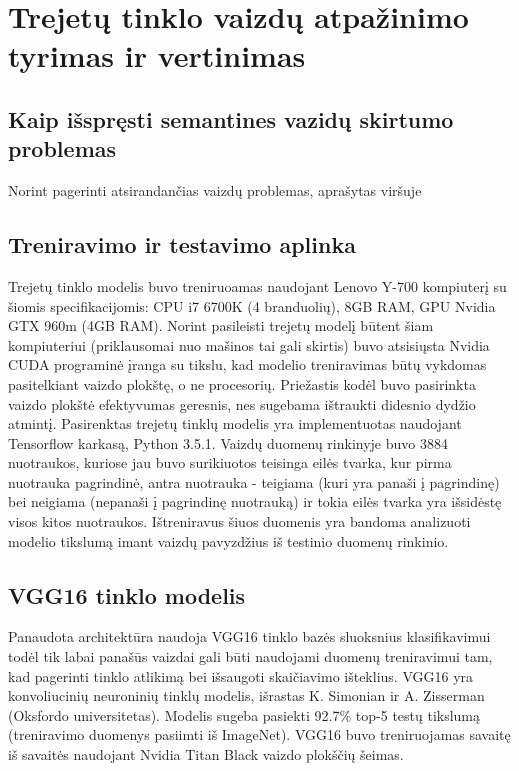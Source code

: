 \documentclass{VUMIFPSkursinis}
\begin{document}
\section{Trejetų tinklo vaizdų atpažinimo tyrimas ir vertinimas}
\subsection{Kaip išspręsti semantines vazidų skirtumo problemas}
Norint pagerinti atsirandančias vaizdų problemas, aprašytas viršuje

\subsection{Treniravimo ir testavimo aplinka}
Trejetų tinklo modelis buvo treniruoamas naudojant Lenovo Y-700 kompiuterį su šiomis specifikacijomis: CPU i7 6700K (4 branduolių), 8GB RAM, GPU Nvidia GTX 960m (4GB RAM). Norint pasileisti trejetų modelį būtent šiam kompiuteriui (priklausomai nuo mašinos tai gali skirtis) buvo atsisiųsta Nvidia CUDA programinė įranga su tikslu, kad modelio treniravimas būtų vykdomas pasitelkiant vaizdo plokštę, o ne procesorių.
\linebreak
Priežastis kodėl buvo pasirinkta vaizdo plokštė efektyvumas geresnis, nes sugebama ištraukti didesnio dydžio atmintį.
\linebreak
Pasirenktas trejetų tinklų modelis yra implementuotas naudojant Tensorflow karkasą, Python 3.5.1.
\linebreak
Vaizdų duomenų rinkinyje buvo 3884 nuotraukos, kuriose jau buvo surikiuotos teisinga eilės tvarka, kur pirma nuotrauka pagrindinė, antra nuotrauka - teigiama (kuri yra panaši į pagrindinę) bei neigiama (nepanaši į pagrindinę nuotrauką) ir tokia eilės tvarka yra išsidėstę visos kitos nuotraukos.
Ištreniravus šiuos duomenis yra bandoma analizuoti modelio tikslumą imant vaizdų pavyzdžius iš testinio duomenų rinkinio.

\subsection{VGG16 tinklo modelis}
Panaudota architektūra naudoja VGG16 tinklo bazės sluoksnius klasifikavimui todėl tik labai panašūs vaizdai gali būti naudojami duomenų treniravimui tam, kad pagerinti tinklo atlikimą bei išsaugoti skaičiavimo išteklius.
\linebreak
VGG16 yra konvoliucinių neuroninių tinklų modelis, išrastas K. Simonian ir A. Zisserman (Oksfordo universitetas). Modelis sugeba pasiekti 92.7\% top-5 testų tikslumą (treniravimo duomenys pasiimti iš ImageNet). VGG16 buvo treniruojamas savaitę iš savaitės naudojant Nvidia Titan Black vaizdo plokščių šeimas.
\end{document}
